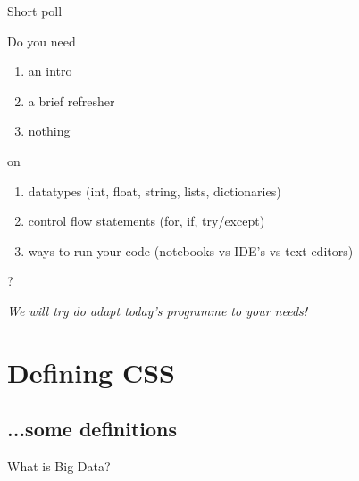 \documentclass{beamer}
\begin{document}
\begin{frame}{Short poll}

Do you need
\begin{enumerate}[a]
	\item an intro
	\item a brief refresher
	\item nothing
\end{enumerate}

on

\begin{enumerate}[i]
	\item datatypes (int, float, string, lists, dictionaries)
	\item control flow statements (for, if, try/except)
	\item ways to run your code (notebooks vs IDE's vs text editors)
\end{enumerate}
?

\emph{We will try do adapt today's programme to your needs!}

\end{frame}


\section{Defining CSS}
\subsection{...some definitions}

\begin{frame}
What is Big Data?
\end{frame}

{
\begin{frame}[plain]
\end{frame}
}
\end{document}
